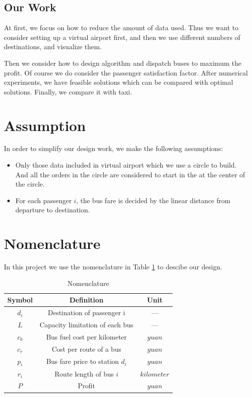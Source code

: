 \documentclass{llncs}
\begin{document}
\subsection{Our Work}
At first, we focus on how to reduce the amount of data used. Thus we want to consider setting up a virtual airport first, and then we use different numbers of destinations, and visualize them.

Then we consider how to design algorithm and dispatch buses to maximum the profit. Of course we do consider the passenger satisfaction factor. After numerical experiments, we have feasible solutions which can be compared with optimal solutions. Finally, we compare it with taxi.


\section{Assumption}
In order to simplify our design work, we make the following assumptions:

\begin{itemize}
	\item Only those data included in virtual airport which we use a circle to build. And all the orders in the circle are considered to start in the at the center of the circle.
	
	\item For each passenger $i$, the bus fare is decided by the linear distance from departure to destination.
	
\end{itemize}

\section{Nomenclature}
In this project we use the nomenclature in Table \ref{tab:Nomen} to descibe our design. 
\begin{table}[h]
	\centering
	\caption{Nomenclature}
	\label{tab:Nomen}
	\fontsize{12}{20}\selectfont
	\begin{tabular}{c c c}
		\hline
		Symbol & Definition & Unit\\
		\hline
		
		$d_i$ & Destination of passenger i & --- \\
		$L$ & Capacity limitation of each bus & --- \\
		$c_b$ & Bus fuel cost per kilometer & $yuan$\\
		$c_r$ & Cost per route of a bus &  $yuan$ \\
		$p_i$ & Bus fare price to station $d_i$  &  $yuan$ \\	
		$r_i$ & Route length of bus $i$  &  $kilometer$ \\	
		$P$ & Profit  &  $yuan$ \\
		
		\hline
	\end{tabular}
\end{table}
\end{document}
